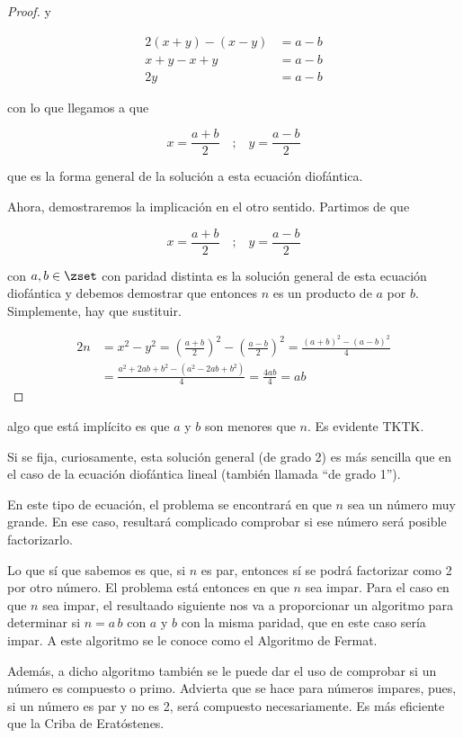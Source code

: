 \begin{proof}
  \noindent y

  \begin{alignat*}{2}
    (x + y) - (x - y)   &= a - b \\
    x + y - x + y       &= a - b \\
    2y                  &= a - b
  \end{alignat*}

  \noindent con lo que llegamos a que

  $$ x = \frac{a + b}{2} \quad \text{;} \quad y = \frac{a - b}{2} $$

  \noindent que es la forma general de la solución a esta ecuación
  diofántica.

  Ahora, demostraremos la implicación en el otro sentido. Partimos de que

  $$ x = \frac{a + b}{2} \quad \text{;} \quad y = \frac{a - b}{2} $$

  \noindent con $a, b \in \zset$ con paridad distinta es la solución general
  de esta ecuación diofántica y debemos demostrar que entonces $n$ es un
  producto de $a$ por $b$. Simplemente, hay que sustituir.

  \begin{alignat*}{2}
    n &= x^2 - y^2 = \left( \frac{a + b}{2} \right)^2 - \left( \frac{a -
      b}{2} \right)^2 = \frac{(a + b)^2 - (a - b)^2}{4} \\
      &= \frac{a^2 +2ab + b^2 - (a^2 - 2ab + b^2)}{4} = \frac{4ab}{4} = ab
  \end{alignat*}
\end{proof}

algo que está implícito es que $a$ y $b$ son menores que $n$. Es evidente
TKTK.

Si se fija, curiosamente, esta solución general (de grado 2) es más sencilla
que en el caso de la ecuación diofántica lineal (también llamada ``de grado
1'').

En este tipo de ecuación, el problema se encontrará en que $n$ sea un número
muy grande. En ese caso, resultará complicado comprobar si ese número será
posible factorizarlo.

Lo que sí que sabemos es que, si $n$ es par, entonces sí se podrá factorizar
como 2 por otro número. El problema está entonces en que $n$ sea impar. Para
el caso en que $n$ sea impar, el resultaado siguiente nos va a proporcionar
un algoritmo para determinar si $n = a \, b$ con $a$ y $b$ con la misma
paridad, que en este caso sería impar. A este algoritmo se le conoce como el
Algoritmo de Fermat.

Además, a dicho algoritmo también se le puede dar el uso de comprobar si un
número es compuesto o primo. Advierta que se hace para números impares,
pues, si un número es par y no es 2, será compuesto necesariamente. Es más
eficiente que la Criba de Eratóstenes.
